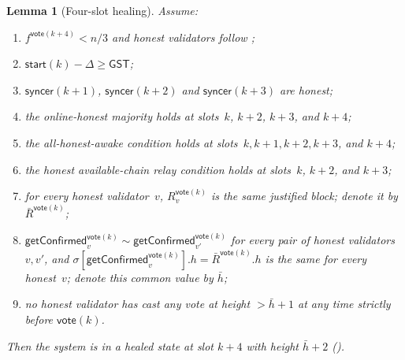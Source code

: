 \documentclass{article}
\newcommand{\syncer}{\mathsf{syncer}}
\newcommand{\start}{\mathsf{start}}
\newcommand{\vote}{\mathsf{vote}}
\newcommand{\comm}[1]{\bar{#1}}
\newcommand{\getConfirmed}{\textsf{getConfirmed}\xspace}
\theoremstyle{plain}
\newtheorem{lemma}{Lemma}
\theoremstyle{definition}
\theoremstyle{remark}
\newcommand{\GST}{\ensuremath{\mathsf{GST}}}
\newcommand{\OHM}{online-honest majority\xspace}
\newcommand{\HAR}{honest available-chain relay\xspace}
\newcommand{\AHA}{all-honest-awake\xspace}
\begin{document}
\begin{lemma}[Four-slot healing]\label{rev:lem:healing-four-slot}
Assume:
\begin{enumerate}
  \item $f^{\vote(k+4)} < n/3$ and honest validators follow ;
  \item $\start(k) - \Delta \geq \GST$;
  \item $\syncer(k+1)$, $\syncer(k+2)$ and $\syncer(k+3)$ are honest;
  \item the \OHM holds at slots~$k$, $k+2$, $k+3$, and $k+4$;
  \item the \AHA condition holds at slots~$k, k+1, k+2, k+3$, and $k+4$;
  \item the \HAR condition holds at slots~$k$, $k+2$, and $k+3$;
  \item for every honest validator~$v$, $R_v^{\vote(k)}$ is the same justified block; denote it by $\comm{R}^{\vote(k)}$;
  \item $\getConfirmed_v^{\vote(k)} \sim \getConfirmed_{v'}^{\vote(k)}$ for every pair of honest validators~$v, v'$, and $\sigma[\getConfirmed_v^{\vote(k)}].h = \comm{R}^{\vote(k)}.h$ is the same for every honest~$v$; denote this common value by $\comm{h}$;
  \item no honest validator has cast any vote at height $> \comm{h}+1$ at any time strictly before $\vote(k)$.
\end{enumerate}
Then the system is in a healed state at slot $k+4$ with height $\comm{h}+2$ ().
\end{lemma}
\end{document}
